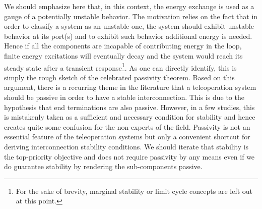 \begin{rem} We should emphasize here that, in this context, the energy exchange is used as a gauge of a 
potentially unstable behavior. The motivation relies on the fact that in order to classify a system as an 
unstable one, the system should exhibit unstable behavior at its port(s) and to exhibit such behavior 
additional energy is needed. Hence if all the components are incapable of contributing energy in the loop, 
finite energy excitations will eventually decay and the system would reach its steady state after a transient 
response\footnote{For the sake of brevity, marginal stability or limit cycle concepts are left out at this 
point.}. As one can directly identify, this is simply the rough sketch of the celebrated passivity theorem. 
Based on this argument, there is a recurring theme in the literature that a teleoperation system should be 
passive in order to have a stable interconnection. This is due to the hypothesis that end terminations are 
also passive. However, in a few studies, this is mistakenly taken as a sufficient and necessary condition 
for stability and hence creates quite some confusion for the non-experts of the field. Passivity is not an 
essential feature of the teleoperation systems but only a convenient shortcut for deriving interconnection 
stability conditions. We should iterate that stability is the top-priority objective and does not require 
passivity by any means even if we do guarantee stability by rendering the sub-components passive. 
\end{rem}


